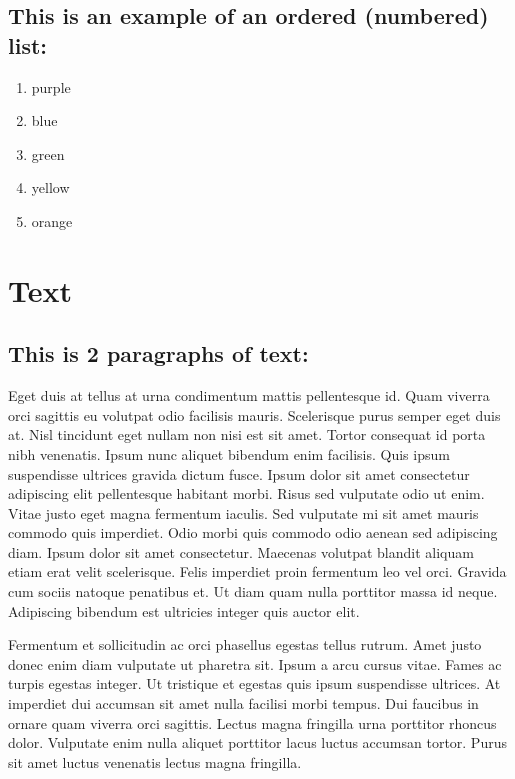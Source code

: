 \documentclass{article}
\begin{document}
	\subsection{This is an example of an ordered (numbered) list:}
	\begin{enumerate}
		\item purple
		\item blue
		\item green
		\item yellow
		\item orange
	\end{enumerate}

	\section{Text}
	\subsection{This is 2 paragraphs of text:}
Eget duis at tellus at urna condimentum mattis pellentesque id. Quam viverra orci sagittis eu volutpat odio facilisis mauris. Scelerisque purus semper eget duis at. Nisl tincidunt eget nullam non nisi est sit amet. Tortor consequat id porta nibh venenatis. Ipsum nunc aliquet bibendum enim facilisis. Quis ipsum suspendisse ultrices gravida dictum fusce. Ipsum dolor sit amet consectetur adipiscing elit pellentesque habitant morbi. Risus sed vulputate odio ut enim. Vitae justo eget magna fermentum iaculis. Sed vulputate mi sit amet mauris commodo quis imperdiet. Odio morbi quis commodo odio aenean sed adipiscing diam. Ipsum dolor sit amet consectetur. Maecenas volutpat blandit aliquam etiam erat velit scelerisque. Felis imperdiet proin fermentum leo vel orci. Gravida cum sociis natoque penatibus et. Ut diam quam nulla porttitor massa id neque. Adipiscing bibendum est ultricies integer quis auctor elit.

Fermentum et sollicitudin ac orci phasellus egestas tellus rutrum. Amet justo donec enim diam vulputate ut pharetra sit. Ipsum a arcu cursus vitae. Fames ac turpis egestas integer. Ut tristique et egestas quis ipsum suspendisse ultrices. At imperdiet dui accumsan sit amet nulla facilisi morbi tempus. Dui faucibus in ornare quam viverra orci sagittis. Lectus magna fringilla urna porttitor rhoncus dolor. Vulputate enim nulla aliquet porttitor lacus luctus accumsan tortor. Purus sit amet luctus venenatis lectus magna fringilla.

\newpage
\end{document}
